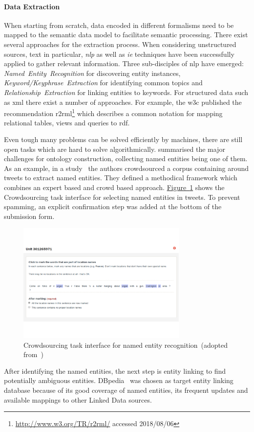 \paragraph{Data Extraction} When starting from scratch, data encoded in different formalisms need to be mapped to the semantic data model to facilitate semantic processing. 
There exist several approaches for the extraction process. When considering unstructured sources, text in particular, \emph{\gls{nlp}} as well as \emph{\gls{ie}} techniques have been successfully applied to gather relevant information. Three sub-disciples of \gls{nlp} have emerged: \emph{Named~Entity~Recognition} for discovering entity instances, \emph{Keyword/Keyphrase~Extraction} for identifying common topics and \emph{Relationship~Extraction} for linking entities to keywords. For structured data such as \gls{xml} there exist a number of approaches. For example, the \gls{w3c} published the recommendation \gls{r2rml}\footnote{\url{http://www.w3.org/TR/r2rml/} accessed 2018/08/06} which describes a common notation for mapping relational tables, views and queries to \gls{rdf}. 

Even tough many problems can be solved efficiently by machines, there are still open tasks which are hard to solve algorithmically. \cite{siorpaes2008ontogame} summarised the major challenges for ontology construction, collecting named entities being one of them. 
As an example, in a study~\cite{bontcheva2017} the authors crowdsourced a corpus containing around  tweets to extract named entities. They defined a methodical framework which combines an expert based and crowd based approach. 
\hyperref[fig:named_entity_recognition]{Figure~\ref*{fig:named_entity_recognition}} shows the Crowdsourcing task interface for selecting named entities in tweets. To prevent spamming, an explicit confirmation step was added at the bottom of the submission form. 
\begin{figure}
	 \centering
	 \includegraphics[width=0.75\textwidth]{graphics/named_entity_recognition}
	 \caption{Crowdsourcing task interface for named entity recognition~(adopted from~\cite{bontcheva2017})}
	 \label{fig:named_entity_recognition}
\end{figure}  
After identifying the named entities, the next step is entity linking to find potentially ambiguous entities. DBpedia~\cite{auer2007} was chosen as target entity linking database because of its good coverage of named entities, its frequent updates and available mappings to other Linked Data sources. 


